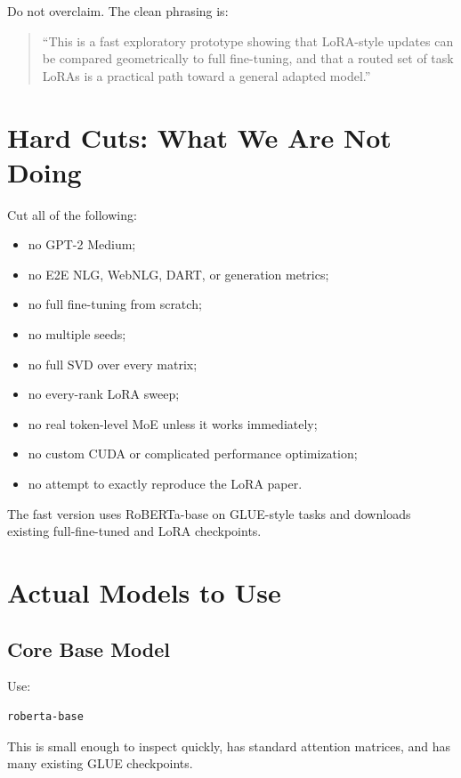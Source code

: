 \documentclass[11pt]{article}
\begin{document}
Do not overclaim. The clean phrasing is:

\begin{quote}
``This is a fast exploratory prototype showing that LoRA-style updates can be compared geometrically to full fine-tuning, and that a routed set of task LoRAs is a practical path toward a general adapted model.''
\end{quote}

\section{Hard Cuts: What We Are Not Doing}

Cut all of the following:

\begin{itemize}[leftmargin=*]
    \item no GPT-2 Medium;
    \item no E2E NLG, WebNLG, DART, or generation metrics;
    \item no full fine-tuning from scratch;
    \item no multiple seeds;
    \item no full SVD over every matrix;
    \item no every-rank LoRA sweep;
    \item no real token-level MoE unless it works immediately;
    \item no custom CUDA or complicated performance optimization;
    \item no attempt to exactly reproduce the LoRA paper.
\end{itemize}

The fast version uses RoBERTa-base on GLUE-style tasks and downloads existing full-fine-tuned and LoRA checkpoints.

\section{Actual Models to Use}

\subsection{Core Base Model}

Use:

\begin{lstlisting}
roberta-base
\end{lstlisting}

This is small enough to inspect quickly, has standard attention matrices, and has many existing GLUE checkpoints.
\end{document}
